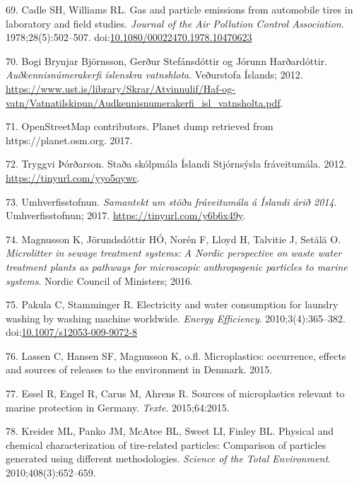 \documentclass[icelandic,]{book}
\begin{document}
\leavevmode\hypertarget{ref-Cadle1978}{}%
69. Cadle SH, Williams RL. Gas and particle emissions from automobile tires in laboratory and field studies. \emph{Journal of the Air Pollution Control Association}. 1978;28(5):502--507. doi:\href{https://doi.org/10.1080/00022470.1978.10470623}{10.1080/00022470.1978.10470623}

\leavevmode\hypertarget{ref-Bj2012}{}%
70. Bogi Brynjar Björnsson, Gerður Stefánsdóttir og Jórunn Harðardóttir. \emph{Auðkennisnúmerakerfi íslenskra vatnshlota}. Veðurstofa Íslands; 2012. \url{https://www.ust.is/library/Skrar/Atvinnulif/Haf-og-vatn/Vatnatilskipun/Audkennisnumerakerfi_isl_vatnsholta.pdf}.

\leavevmode\hypertarget{ref-OpenStreetMap}{}%
71. OpenStreetMap contributors. Planet dump retrieved from https://planet.osm.org. 2017.

\leavevmode\hypertarget{ref-uxdeoruxf0arson2012}{}%
72. Tryggvi Þórðarson. Staða skólpmála Íslandi Stjórnsýsla fráveitumála. 2012. \url{https://tinyurl.com/yyo5qywc}.

\leavevmode\hypertarget{ref-Umhverfisstofnun2017}{}%
73. Umhverfisstofnun. \emph{Samantekt um stöðu fráveitumála á Íslandi árið 2014}. Umhverfisstofnun; 2017. \url{https://tinyurl.com/y6b6x49y}.

\leavevmode\hypertarget{ref-magnusson2016microlitter}{}%
74. Magnusson K, Jörundsdóttir HÓ, Norén F, Lloyd H, Talvitie J, Setälä O. \emph{Microlitter in sewage treatment systems: A Nordic perspective on waste water treatment plants as pathways for microscopic anthropogenic particles to marine systems}. Nordic Council of Ministers; 2016.

\leavevmode\hypertarget{ref-Pakula2010}{}%
75. Pakula C, Stamminger R. Electricity and water consumption for laundry washing by washing machine worldwide. \emph{Energy Efficiency}. 2010;3(4):365--382. doi:\href{https://doi.org/10.1007/s12053-009-9072-8}{10.1007/s12053-009-9072-8}

\leavevmode\hypertarget{ref-lassen2015microplastics}{}%
76. Lassen C, Hansen SF, Magnusson K, o.fl. Microplastics: occurrence, effects and sources of releases to the environment in Denmark. 2015.

\leavevmode\hypertarget{ref-essel2015sources}{}%
77. Essel R, Engel R, Carus M, Ahrens R. Sources of microplastics relevant to marine protection in Germany. \emph{Texte}. 2015;64:2015.

\leavevmode\hypertarget{ref-kreider2010physical}{}%
78. Kreider ML, Panko JM, McAtee BL, Sweet LI, Finley BL. Physical and chemical characterization of tire-related particles: Comparison of particles generated using different methodologies. \emph{Science of the Total Environment}. 2010;408(3):652--659.
\end{document}
